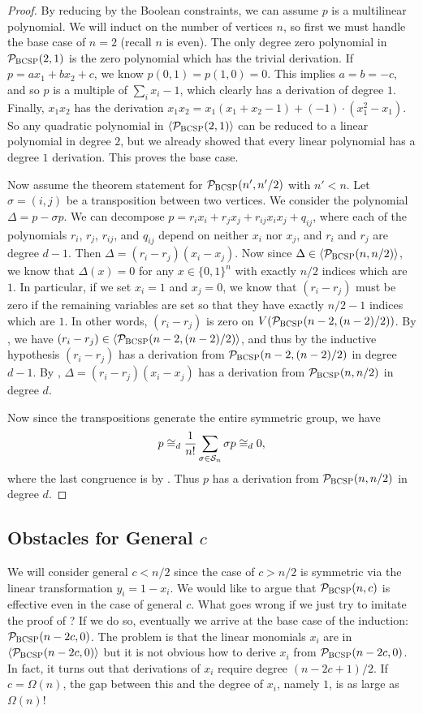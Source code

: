 \begin{proof}
By reducing by the Boolean constraints, we can assume $p$ is a multilinear polynomial. 
We will induct on the number of vertices $n$, so first we must handle the base case of $n = 2$ (recall $n$ is even). 
The only degree zero polynomial in $\mathcal P_{\textsc{BCSP}}(2,1)$ is the zero polynomial which has the trivial derivation. 
If $p = ax_1 + bx_2 + c$, we know $p(0,1) = p(1,0) = 0$. This implies $a = b = -c$, and so $p$ is a multiple of $\sum_i x_i - 1$, which clearly has a derivation of degree $1$.
Finally, $x_1x_2$ has the derivation $x_1x_2 = x_1(x_1+x_2-1) + (-1)\cdot(x_1^2 - x_1)$. So any quadratic polynomial in $\langle \mathcal P_{\textsc{BCSP}}(2,1) \rangle$ can be reduced to a linear polynomial in degree $2$, but we already showed that every linear polynomial has a degree $1$ derivation. This proves the base case. 

Now assume the theorem statement for $\mathcal P_{\textsc{BCSP}}(n',n'/2)$ with $n' < n$. 
Let $\sigma = (i,j)$ be a transposition between two vertices. 
We consider the polynomial $\Delta = p - \sigma p$. 
We can decompose $p = r_i x_i + r_j x_j + r_{ij} x_ix_j + q_{ij}$, where each of the polynomials $r_i$, $r_j$, $r_{ij}$, and $q_{ij}$ depend on neither $x_i$ nor $x_j$, and $r_i$ and $r_j$ are degree $d-1$. Then $\Delta = (r_i - r_j)(x_i - x_j)$. Now since $\Delta \in \langle \mathcal P_{\textsc{BCSP}}(n,n/2) \rangle$, we know that $\Delta(x) = 0$ for any $x \in \{0,1\}^n$ with exactly $n/2$ indices which are $1$. In particular, if we set $x_i = 1$ and $x_j = 0$, we know that $(r_i - r_j)$ must be zero if the remaining variables are set so that they have exactly $n/2 - 1$ indices which are $1$. In other words, $(r_i - r_j)$ is zero on $V(\mathcal P_{\textsc{BCSP}}(n-2,(n-2)/2))$. By , we have $(r_i - r_j) \in \langle \mathcal P_{\textsc{BCSP}}(n-2,(n-2)/2) \rangle$, and thus by the inductive hypothesis $(r_i - r_j)$ has a derivation from $\mathcal P_{\textsc{BCSP}}(n-2,(n-2)/2)$ in degree $d-1$. By , $\Delta = (r_i - r_j)(x_i - x_j)$ has a derivation from $\mathcal P_{\textsc{BCSP}}(n,n/2)$ in degree $d$. 

Now since the transpositions generate the entire symmetric group, we have 
\[p \cong_d \frac{1}{n!} \sum_{\sigma \in \mathcal S_n} \sigma p \cong_d 0,\] 
where the last congruence is by . Thus $p$ has a derivation from $\mathcal P_{\textsc{BCSP}}(n,n/2)$ in degree $d$. 
\end{proof}

\subsection{Obstacles for General $c$}
We will consider general $c < n/2$ since the case of $c > n/2$ is symmetric via the linear transformation $y_i = 1 - x_i$.
We would like to argue that $\mathcal P_{\textsc{BCSP}}(n,c)$ is effective even in the case of general $c$.
What goes wrong if we just try to imitate the proof of ?
If we do so, eventually we arrive at the base case of the induction: $\mathcal P_{\textsc{BCSP}}(n-2c,0)$.
The problem is that the linear monomials $x_i$ are in $\langle \mathcal P_{\textsc{BCSP}}(n-2c,0) \rangle$ but it is not obvious how to derive $x_i$ from $\mathcal P_{\textsc{BCSP}}(n-2c,0)$. 
In fact, it turns out that derivations of $x_i$ require degree $(n-2c+1)/2$. If $c = \Omega(n)$, the gap between this and the degree of $x_i$, namely $1$, is as large as $\Omega(n)$!

